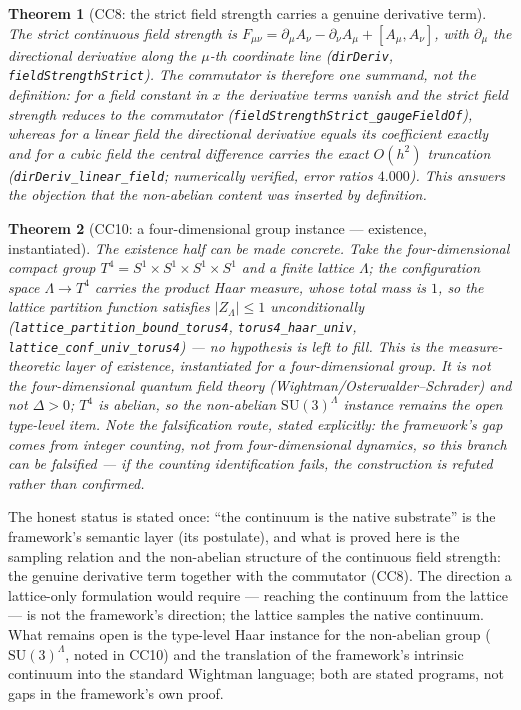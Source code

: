 \documentclass[aps,prd,preprint,superscriptaddress,amsmath,amssymb]{revtex4-2}
\newtheorem{theorem}{Theorem}[section]
\begin{document}
\begin{theorem}[CC8: the strict field strength carries a genuine derivative term]
\label{thm:cc8}
The strict continuous field strength is
$F_{\mu\nu}=\partial_\mu A_\nu-\partial_\nu A_\mu+[A_\mu,A_\nu]$, with
$\partial_\mu$ the directional derivative along the $\mu$-th
coordinate line (\texttt{dirDeriv}, \texttt{fieldStrengthStrict}).  The
commutator is therefore \emph{one summand}, not the definition: for a
field constant in $x$ the derivative terms vanish and the strict field
strength reduces to the commutator
(\texttt{fieldStrengthStrict\_\allowbreak gaugeFieldOf}), whereas for a linear field
the directional derivative equals its coefficient exactly and for a
cubic field the central difference carries the exact $O(h^2)$
truncation (\texttt{dirDeriv\_\allowbreak linear\_field}; numerically verified,
error ratios $4.000$).  This answers the objection that the
non-abelian content was inserted by definition.
\end{theorem}

\begin{theorem}[CC10: a four-dimensional group instance --- existence, instantiated]
\label{thm:cc10}
The existence half can be made concrete.  Take the \emph{four-dimensional
compact group} $T^4=S^1\times S^1\times S^1\times S^1$ and a finite lattice
$\Lambda$; the configuration space $\Lambda\to T^4$ carries the product
Haar measure, whose total mass is $1$, so the lattice partition function
satisfies $|Z_\Lambda|\le 1$ \emph{unconditionally}
(\texttt{lattice\_partition\_bound\_torus4}, \texttt{torus4\_haar\_univ},
\texttt{lattice\_conf\_univ\_torus4}) --- no hypothesis is left to fill.
This is the measure-theoretic layer of existence, instantiated for a
four-dimensional group.  It is \emph{not} the four-dimensional quantum
field theory (Wightman/Osterwalder--Schrader) and \emph{not} $\Delta>0$;
$T^4$ is abelian, so the non-abelian $\mathrm{SU}(3)^{\Lambda}$ instance
remains the open type-level item.  Note the falsification route, stated
explicitly: the framework's gap comes from \emph{integer counting}, not
from four-dimensional dynamics, so this branch can be \emph{falsified}
--- if the counting identification fails, the construction is refuted
rather than confirmed.
\end{theorem}

The honest status is stated once: ``the continuum is the native
substrate'' is the framework's semantic layer (its postulate), and
what is proved here is the sampling relation and the non-abelian
structure of the continuous field strength: the genuine derivative
term together with the commutator (CC8).  The direction a
lattice-only formulation would require --- reaching the continuum
from the lattice --- is not the framework's direction; the lattice
samples the native continuum.  What remains open is the type-level
Haar instance for the non-abelian group ($\mathrm{SU}(3)^{\Lambda}$,
noted in CC10) and the translation of the framework's intrinsic
continuum into the standard Wightman language; both are stated
programs, not gaps in the framework's own proof.
\end{document}
